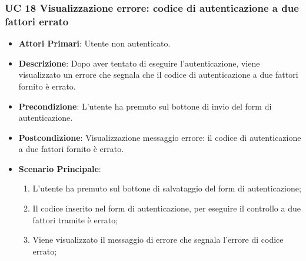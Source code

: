		\subsubsection{UC 18 Visualizzazione errore: codice di autenticazione a due fattori errato}
		\begin{itemize}
			\item \textbf{Attori Primari}: Utente non autenticato.
			\item \textbf{Descrizione}: Dopo aver tentato di eseguire l'autenticazione, viene visualizzato un errore che segnala che il codice di autenticazione a due fattori fornito è errato.
			\item \textbf{Precondizione}: L'utente ha premuto sul bottone di invio del form di autenticazione.
			\item \textbf{Postcondizione}: Visualizzazione messaggio errore: il codice di autenticazione a due fattori fornito è errato.
			\item \textbf{Scenario Principale}:
			\begin{enumerate}
				\item L'utente ha premuto sul bottone di salvataggio del form di autenticazione;
				\item Il codice inserito nel form di autenticazione, per eseguire il controllo a due fattori tramite  è errato;
				\item Viene visualizzato il messaggio di errore che segnala l'errore di codice errato;
			\end{enumerate}
		\end{itemize}